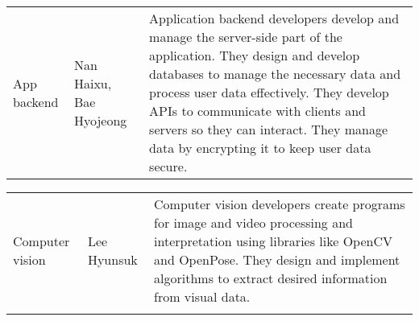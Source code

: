 \begin{enumerate}[label=\arabic*]
    \begin{table}[H]
    \center
    \begin{tabular}{m{1.4cm} m{1.5cm} m{4cm}}
    App backend & Nan Haixu, Bae Hyojeong & Application backend developers develop and manage the server-side part of the application. They design and develop databases to manage the necessary data and process user data effectively. They develop APIs to communicate with clients and servers so they can interact. They manage data by encrypting it to keep user data secure. \\
    \end{tabular}
    \end{table}

    \begin{table}[H]
    \center
    \begin{tabular}{m{1.4cm} m{1.5cm} m{4cm}}
    Computer vision & Lee Hyunsuk & Computer vision developers create programs for image and video processing and interpretation using libraries like OpenCV and OpenPose. They design and implement algorithms to extract desired information from visual data. \\\\
    \bottomrule
    \end{tabular}
    \end{table}
    
\end{enumerate}

